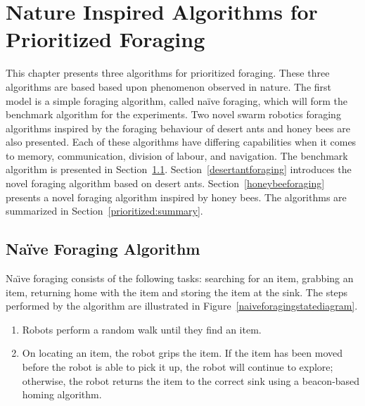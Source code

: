 
\chapter{Nature Inspired Algorithms for Prioritized Foraging}
\label{chap:third}


This chapter presents three algorithms for prioritized foraging. These three algorithms are based based upon phenomenon observed in nature. The first model is a simple foraging algorithm, called na\"ive foraging, which will form the benchmark algorithm for the experiments. Two novel swarm robotics foraging algorithms inspired by the foraging behaviour of desert ants and honey bees are also presented. Each of these algorithms have differing capabilities when it comes to memory, communication, division of labour, and navigation. The benchmark algorithm is presented in Section~\ref{naiveforaging}. Section~\ref{desertantforaging} introduces the novel foraging algorithm based on desert ants. Section~\ref{honeybeeforaging} presents a novel foraging algorithm inspired by honey bees. The algorithms are summarized in Section~\ref{prioritized:summary}.

\section{Na\"ive Foraging Algorithm}
\label{naiveforaging}

 Na\"\i ve foraging consists of the following tasks: searching for an item, grabbing an item, returning home with the item and storing the item at the sink. The steps performed by the algorithm are illustrated in Figure~\ref{naiveforagingstatediagram}.  

\begin{enumerate}
	\item Robots perform a random walk until they find an item.
	\item On locating an item, the robot grips the item. If the item has been moved before the robot is able to pick it up, the robot will continue to explore; otherwise, the robot returns the item to the correct sink using a beacon-based homing algorithm.
\end{enumerate}

